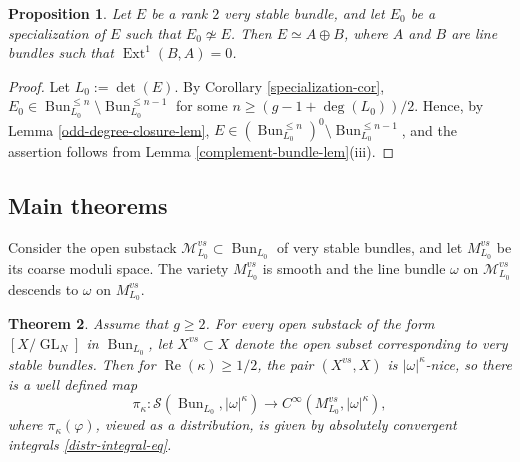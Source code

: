 \documentclass[12pt,reqno]{amsart}
\DeclareMathOperator\C{\mathbb C}
\newtheorem{theorem}{Theorem}[section]
\newtheorem{prop}[theorem]{Proposition}
\theoremstyle{definition}
\theoremstyle{remark}
\numberwithin{equation}{section}
\newcommand{\Ext}{\operatorname{Ext}}
\renewcommand{\SS}{{\mathcal S}}
\newcommand{\MM}{{\mathcal M}}
\newcommand{\sub}{\subset}
\newcommand{\om}{\omega}
\newcommand{\GL}{\operatorname{GL}}
\newcommand{\Bun}{{\operatorname{Bun}}}
\newcommand{\PGL}{{\operatorname{PGL}}}
\begin{document}
\begin{prop}
Let $E$ be a rank $2$ very stable bundle, and let $E_0$ be a specialization of $E$ such that $E_0\not\simeq E$.
Then $E\simeq A\oplus B$, where $A$ and $B$ are line bundles such that $\Ext^1(B,A)=0$.
\end{prop}

\begin{proof} Let $L_0:=\det(E)$. By Corollary \ref{specialization-cor}, $E_0\in \Bun_{L_0}^{\le n}\setminus \Bun_{L_0}^{\le n-1}$ for some $n\ge (g-1+\deg(L_0))/2$.
Hence, by Lemma \ref{odd-degree-closure-lem}, $E\in (\Bun_{L_0}^{\le n})^0\setminus \Bun_{L_0}^{\le n-1}$, and the assertion follows from 
Lemma \ref{complement-bundle-lem}(iii).
\end{proof}

\subsection{Main theorems}\label{main-thm-sec}


Consider the open substack
$\MM^{vs}_{L_0}\sub \Bun_{L_0}$ of very stable bundles, and let $M^{vs}_{L_0}$ be its coarse moduli space. The variety $M^{vs}_{L_0}$ is smooth and the line
bundle $\om$ on $\MM^{vs}_{L_0}$ descends to $\om$ on $M^{vs}_{L_0}$.

\begin{theorem}\label{main-thm-nice} 
Assume that $g\ge 2$. For every open substack of the form $[X/\GL_N]$ in $\Bun_{L_0}$, let $X^{vs}\sub X$ denote the open subset corresponding
to very stable bundles. Then for $\operatorname{Re}(\kappa)\ge 1/2$, the pair $(X^{vs},X)$ is $|\om|^{\kappa}$-nice, so 
there is a well defined map
$$\pi_\kappa:\SS(\Bun_{L_0},|\om|^{\kappa})\to C^\infty(M^{vs}_{L_0},|\om|^{\kappa}),$$
where $\pi_{\kappa}(\varphi)$, viewed as a distribution, is given by absolutely convergent integrals \eqref{distr-integral-eq}.
\end{theorem}
\end{document}
